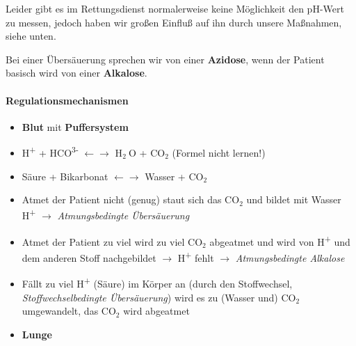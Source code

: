 \documentclass{article}
\newcommand\gSub[1]{\ensuremath{{}_{\text{#1}}}}
\newcommand\gT[1]{\textbf{\textup{\textcolor[rgb]{0.0,0.5019608,0.0}{#1}}}}
\newcommand\gZ[1]{\textcolor[rgb]{0.5019608,0.5019608,0.5019608}{#1}}
\begin{document}
{\mdseries
Leider gibt es im Rettungsdienst normalerweise keine M\"oglichkeit den
pH-Wert zu messen, jedoch haben wir gro{\ss}en Einflu{\ss} auf ihn
durch unsere Ma{\ss}nahmen, siehe unten. }

{\mdseries
Bei einer \"Ubers\"auerung sprechen wir von einer
\gT{Azidose}, wenn der Patient basisch
wird von einer \gT{Alkalose}.}

\paragraph[\ Regulationsmechanismen]{ Regulationsmechanismen}
\begin{itemize}
\item {\mdseries
\textbf{Blut} mit \textbf{Puffersystem}}

\end{itemize}
\begin{itemize}
\item {\mdseries
%
H\textsuperscript{+} + HCO\textsuperscript{3-}
${\leftarrow}$${\rightarrow}$ H\gSub{2 }O + CO\gSub{2
} (Formel nicht lernen!)}

\item {\mdseries
S\"aure \gZ{+ Bikarbonat} ${\leftarrow}$${\rightarrow}$
\gZ{Wasser +} CO\gSub{2}}

\end{itemize}
\begin{itemize}
\item {\mdseries
Atmet der Patient nicht (genug) staut sich das CO\gSub{2} und
bildet mit Wasser H\textsuperscript{+} ${\rightarrow}$
\textit{Atmungsbedingte \"Ubers\"auerung}}

\item {\mdseries
Atmet der Patient zu viel wird zu viel CO\gSub{2} abgeatmet und
wird von H\textsuperscript{+} und dem anderen Stoff nachgebildet
${\rightarrow}$ H\textsuperscript{+} fehlt ${\rightarrow}$
\textit{Atmungsbedingte Alkalose}}

\item {\mdseries
F\"allt zu viel H\textsuperscript{+} (S\"aure) im K\"orper an (durch den
Stoffwechsel, \textit{Stoffwechselbedingte \"Ubers\"auerung}) wird es
zu (Wasser und) CO\gSub{2} umgewandelt, das
CO\gSub{2} wird abgeatmet}

\end{itemize}
\begin{itemize}
\item {\mdseries
\textbf{Lunge} }

\end{itemize}
\end{document}
